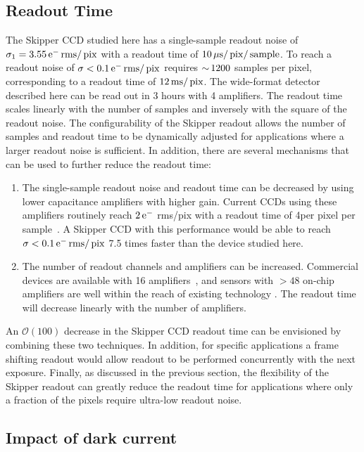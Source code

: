 \documentclass[aps,prl,reprint,superscriptaddress,floatfix,nofootinbib,showkeys,showpacs,preprintnumbers]{revtex4-1}
\begin{document}
\subsection{Readout Time}
The Skipper CCD studied here has a single-sample readout noise of $\sigma_1 = 3.55\mathrm{\,e^{-}} \mathrm{\,rms}/\mathrm{\,pix}$ with a readout time of $10\mathrm{\,\mu s}/\mathrm{\,pix}/\mathrm{\,sample}$. 
To reach a readout noise of $\sigma < 0.1 \mathrm{\,e^{-}} \mathrm{\,rms}/\mathrm{\,pix}$ requires $ {\sim}\, 1200$ samples per pixel, corresponding to a readout time of $12\mathrm{\,ms}/\mathrm{\,pix}$.
The wide-format detector described here can be read out in 3 hours with 4 amplifiers.
The readout time scales linearly with the number of samples and inversely with the square of the readout noise. 
The configurability of the Skipper readout allows the number of samples and readout time to be dynamically adjusted for applications where a larger readout noise is sufficient.
In addition, there are several mechanisms that can be used to further reduce the readout time:
\begin{enumerate}
\item The single-sample readout noise and readout time can be decreased by using lower capacitance amplifiers with higher gain. Current CCDs using these amplifiers routinely reach $2\mathrm{\,e^{-}}$ rms/pix with a readout time of 4\us per pixel per sample~\cite{Bebek:2017}. 
A Skipper CCD with this performance would be able to reach $\sigma < 0.1 \mathrm{\,e^{-}} \mathrm{\,rms}/\mathrm{\,pix}$ 7.5 times faster than the device studied here.
\item The number of readout channels and amplifiers can be increased. Commercial devices are available with 16 amplifiers~\citep{LSST:2015}, and sensors with $>48$ on-chip amplifiers are well within the reach of existing technology \citep{Doering:2011}.
The readout time will decrease linearly with the number of amplifiers. 
\end{enumerate}
 
An $\mathcal{O}(100)$ decrease in the Skipper CCD readout time can be envisioned by combining these two techniques.
In addition, for specific applications a frame shifting readout would allow readout to be performed concurrently with the next exposure.
Finally, as discussed in the previous section, the flexibility of the Skipper readout can greatly reduce the readout time for applications where only a fraction of the pixels require ultra-low readout noise.

\subsection{Impact of dark current}
\end{document}
